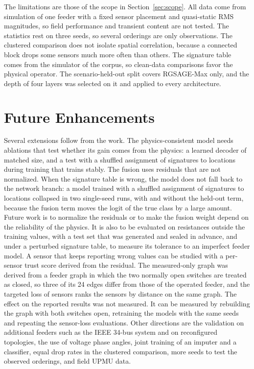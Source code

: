 \documentclass[MTech]{ugthesis}
\begin{document}
The limitations are those of the scope in Section~\ref{sec:scope}. All data come from simulation of one feeder with a fixed sensor placement and quasi-static \ac{RMS} magnitudes, so field performance and transient content are not tested. The statistics rest on three seeds, so several orderings are only observations. The clustered comparison does not isolate spatial correlation, because a connected block drops some sensors much more often than others. The signature table comes from the simulator of the corpus, so clean-data comparisons favor the physical operator. The scenario-held-out split covers RGSAGE-Max only, and the depth of four layers was selected on it and applied to every architecture.

\section{Future Enhancements}

Several extensions follow from the work. The physics-consistent model needs ablations that test whether its gain comes from the physics: a learned decoder of matched size, and a test with a shuffled assignment of signatures to locations during training that trains stably. The fusion uses residuals that are not normalized. When the signature table is wrong, the model does not fall back to the network branch: a model trained with a shuffled assignment of signatures to locations collapsed in two single-seed runs, with and without the held-out term, because the fusion term moves the logit of the true class by a large amount. Future work is to normalize the residuals or to make the fusion weight depend on the reliability of the physics. It is also to be evaluated on resistances outside the training values, with a test set that was generated and sealed in advance, and under a perturbed signature table, to measure its tolerance to an imperfect feeder model. A sensor that keeps reporting wrong values can be studied with a per-sensor trust score derived from the residual. The measured-only graph was derived from a feeder graph in which the two normally open switches are treated as closed, so three of its 24 edges differ from those of the operated feeder, and the targeted loss of sensors ranks the sensors by distance on the same graph. The effect on the reported results was not measured. It can be measured by rebuilding the graph with both switches open, retraining the models with the same seeds and repeating the sensor-loss evaluations. Other directions are the validation on additional feeders such as the IEEE 34-bus system and on reconfigured topologies, the use of voltage phase angles, joint training of an imputer and a classifier, equal drop rates in the clustered comparison, more seeds to test the observed orderings, and field \ac{UPMU} data.

\begin{singlespace}
\end{singlespace}
  
\end{document}
